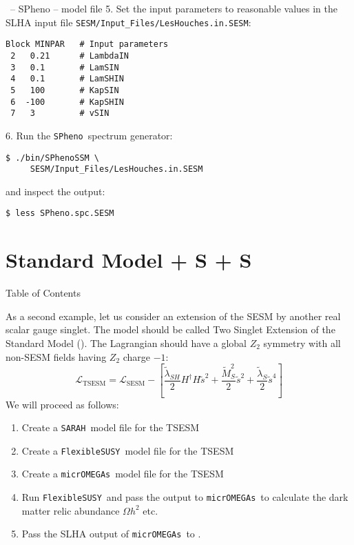 \documentclass[11pt]{beamer}
\newcommand{\FlexibleSUSY}{\texttt{FlexibleSUSY}}
\newcommand{\Lagr}{\mathcal{L}}
\newcommand{\micrOMEGAs}{\texttt{micrOMEGAs}}
\newcommand{\SARAH}{\texttt{SARAH}}
\newcommand{\SESM}{\text{SESM}}
\newcommand{\SModelS}{\text{SModelS}}
\newcommand{\SPheno}{\texttt{SPheno}}
\newcommand{\TSESM}{\text{TSESM}}
\begin{document}

\begin{frame}[fragile]{\insertsection\ -- SPheno -- model file}
  5. Set the input parameters to reasonable values in the SLHA input
  file \texttt{SESM/Input\_Files/LesHouches.in.SESM}:
  \begin{lstlisting}
Block MINPAR   # Input parameters 
 2   0.21      # LambdaIN
 3   0.1       # LamSIN
 4   0.1       # LamSHIN
 5   100       # KapSIN
 6  -100       # KapSHIN
 7   3         # vSIN\end{lstlisting}%
  6. Run the \SPheno\ spectrum generator:
  \begin{lstlisting}
$ ./bin/SPhenoSSM \
     SESM/Input_Files/LesHouches.in.SESM\end{lstlisting}%
  and inspect the output:
  \begin{lstlisting}
$ less SPheno.spc.SESM\end{lstlisting}%
\end{frame}


\section{Standard Model + S + S}


\begin{frame}{Table of Contents}
  \tableofcontents[currentsection]
\end{frame}


\begin{frame}{\insertsection}
  As a second example, let us consider an extension of the SESM by
  another real scalar gauge singlet. The model should be called Two
  Singlet Extension of the Standard Model (\TSESM). The Lagrangian
  should have a global $Z_2$ symmetry with all non-SESM fields having
  $Z_2$ charge $-1$:
  \begin{equation*}
    \Lagr_{\TSESM} = \Lagr_{\SESM} - \left[\frac{\tilde\lambda_{SH}}{2} H^\dagger H \tilde{s}^2 + \frac{\tilde{M}_S^2}{2} \tilde{s}^2 + \frac{\tilde{\lambda}_S}{2} \tilde{s}^4\right]
  \end{equation*}
  We will proceed as follows:
  \begin{enumerate}
  \item Create a \SARAH\ model file for the TSESM
  \item Create a \FlexibleSUSY\ model file for the TSESM
  \item Create a \micrOMEGAs\ model file for the TSESM
  \item Run \FlexibleSUSY\ and pass the output to \micrOMEGAs\ to
    calculate the dark matter relic abundance $\Omega h^2$ etc.
  \item Pass the SLHA output of \micrOMEGAs\ to \SModelS.
  \end{enumerate}
\end{frame}
\end{document}
